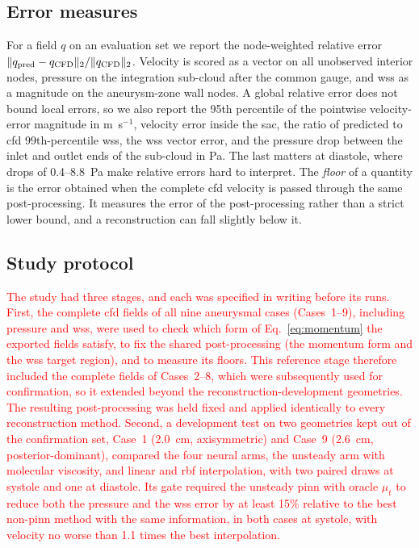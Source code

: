 \documentclass[12pt,a4paper]{article}
\newcommand{\CFD}{\ac{cfd}\xspace}
\newcommand{\PINN}{\ac{pinn}\xspace}
\newcommand{\WSS}{\ac{wss}\xspace}
\newcommand{\RBF}{\ac{rbf}\xspace}
\theoremstyle{definition}
\numberwithin{equation}{section}
\newcommand{\revision}[1]{\textcolor{red}{#1}}
\begin{document}
\subsection{Error measures}
\label{sec:metrics}
For a field $q$ on an evaluation set we report the node-weighted relative error $\|q_{\rm pred}-q_{\rm CFD}\|_2/\|q_{\rm CFD}\|_2$. Velocity is scored as a vector on all unobserved interior nodes, pressure on the integration sub-cloud after the common gauge, and \WSS as a magnitude on the aneurysm-zone wall nodes. A global relative error does not bound local errors, so we also report the 95th percentile of the pointwise velocity-error magnitude in m~s$^{-1}$, velocity error inside the sac, the ratio of predicted to \CFD 99th-percentile \WSS, the \WSS vector error, and the pressure drop between the inlet and outlet ends of the sub-cloud in Pa. The last matters at diastole, where drops of 0.4--8.8~Pa make relative errors hard to interpret. The \emph{floor} of a quantity is the error obtained when the complete \CFD velocity is passed through the same post-processing. It measures the error of the post-processing rather than a strict lower bound, and a reconstruction can fall slightly below it.

\subsection{Study protocol}
\label{sec:protocol}
\revision{The study had three stages, and each was specified in writing before its runs. First, the complete \CFD fields of all nine aneurysmal cases (Cases~1--9), including pressure and \WSS, were used to check which form of Eq.~\eqref{eq:momentum} the exported fields satisfy, to fix the shared post-processing (the momentum form and the \WSS target region), and to measure its floors. This reference stage therefore included the complete fields of Cases~2--8, which were subsequently used for confirmation, so it extended beyond the reconstruction-development geometries. The resulting post-processing was held fixed and applied identically to every reconstruction method. Second, a development test on two geometries kept out of the confirmation set, Case~1 (2.0~cm, axisymmetric) and Case~9 (2.6~cm, posterior-dominant), compared the four neural arms, the unsteady arm with molecular viscosity, and linear and \RBF interpolation, with two paired draws at systole and one at diastole. Its gate required the unsteady \PINN with oracle $\mu_t$ to reduce both the pressure and the \WSS error by at least 15\% relative to the best non-\PINN method with the same information, in both cases at systole, with velocity no worse than 1.1 times the best interpolation.}
\end{document}
